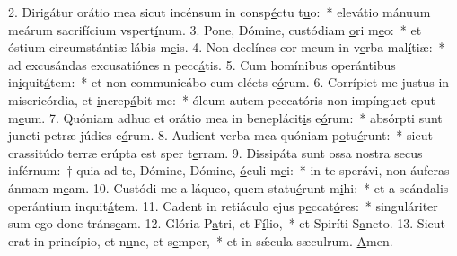 2. Dirigátur orátio mea sicut incénsum in consp\uline{é}ctu t\uline{u}o:~* elevátio mánuum meárum sacrifícium vspert\uline{í}num.
3. Pone, Dómine, custódiam \uline{o}ri m\uline{e}o:~* et óstium circumstántiæ lábis m\uline{e}is.
4. Non declínes cor meum in v\uline{e}rba mal\uline{í}tiæ:~* ad excusándas excusatiónes n pecc\uline{á}tis.
5. Cum homínibus operántibus in\uline{i}quit\uline{á}tem:~* et non communicábo cum elécts e\uline{ó}rum.
6. Corrípiet me justus in misericórdia, et \uline{i}ncrep\uline{á}bit me:~* óleum autem peccatóris non impínguet cput m\uline{e}um.
7. Quóniam adhuc et orátio mea in beneplácit\uline{i}s e\uline{ó}rum:~* absórpti sunt juncti petræ júdics e\uline{ó}rum.
8. Audient verba mea quóniam p\uline{o}tu\uline{é}runt:~* sicut crassitúdo terræ erúpta est sper t\uline{e}rram.
9. Dissipáta sunt ossa nostra secus inférnum:~† quia ad te, Dómine, Dómine, \uline{ó}culi m\uline{e}i:~* in te sperávi, non áuferas ánmam m\uline{e}am.
10. Custódi me a láqueo, quem statu\uline{é}runt m\uline{i}hi:~* et a scándalis operántium inquit\uline{á}tem.
11. Cadent in retiáculo ejus p\uline{e}ccat\uline{ó}res:~* singuláriter sum ego donc tráns\uline{e}am.
12. Glória P\uline{a}tri, et F\uline{í}lio,~* et Spiríti S\uline{a}ncto.
13. Sicut erat in princípio, et n\uline{u}nc, et s\uline{e}mper,~* et in sǽcula sæculrum. \uline{A}men.
